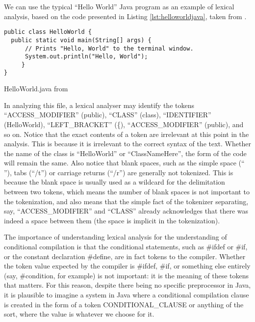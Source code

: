 We can use the typical ``Hello World'' Java program as an example of lexical analysis, based on the code presented in Listing \ref{lst:helloworldjava}, taken from \cite{SEDGEWICK:2011}.

\begin{listing}
\begin{verbatim}
public class HelloWorld {
  public static void main(String[] args) {
      // Prints "Hello, World" to the terminal window.
      System.out.println("Hello, World");
     }
}
\end{verbatim}
\caption{HelloWorld.java from \cite{SEDGEWICK:2011}} \label{lst:helloworldjava}
\end{listing}

In analyzing this file, a lexical analyser may identify the tokens ``ACCESS_MODIFIER'' (public), ``CLASS'' (class), ``IDENTIFIER'' (HelloWorld), ``LEFT_BRACKET'' (\{), ``ACCESS_MODIFIER'' (public), and so on. Notice that the exact contents of a token are irrelevant at this point in the analysis. This is because it is irrelevant to the correct syntax of the text. Whether the name of the class is ``HelloWorld'' or ``ClassNameHere'', the form of the code will remain the same. Also notice that blank spaces, such as the simple space (`` ''), tabs (``/t'') or carriage returns (``/r'') are generally not tokenized. This is because the blank space is usually used as a wildcard for the delimitation between two tokens, which means the number of blank spaces is not important to the tokenization, and also means that the simple fact of the tokenizer separating, say, ``ACCESS_MODIFIER'' and ``CLASS'' already acknowledges that there was indeed a space between them (the space is implicit in the tokenization).

The importance of understanding lexical analysis for the understanding of conditional compilation is that the conditional statements, such as \#ifdef or \#if, or the constant declaration \#define, are in fact tokens to the compiler. Whether the token value expected by the compiler is \#ifdef, \#if, or something else entirely (say, \#condition, for example) is not important: it is the meaning of these tokens that matters. For this reason, despite there being no specific preprocessor in Java, it is plausible to imagine a system in Java where a conditional compilation clause is created in the form of a token CONDITIONAL_CLAUSE or anything of the sort, where the value is whatever we choose for it.

